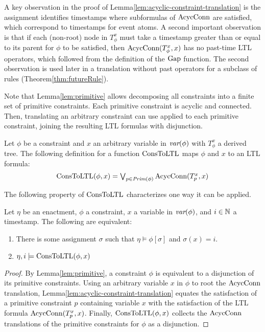 A key observation in
the proof of Lemma\:\ref{lem:acyclic-constraint-translation}
is the assignment identifies timestamps where subformulas of $\text{AcycConn}$ are satisfied,
which correspond to timestamps for event atoms.
A second important observation
is that if
each (non-root) node in $T_\phi^x$ must take a timestamp greater than
or equal to its parent for $\phi$ to be satisfied,
then $\text{AcycConn}(T_\phi^x,x)$ has no past-time LTL operators,
which followed from the definition of the $\text{Gap}$ function.
The second observation is used later in a translation without
past operators for a subclass of rules
(Theorem\:\ref{thm:futureRule}).

\smallskip

Note that
Lemma\:\ref{lem:primitive} allows decomposing
all constraints into a finite set of primitive constraints.
Each primitive constraint is acyclic and connected.
Then, translating an arbitrary constraint
can use {\AcycConn} applied to each primitive constraint,
joining the resulting LTL formulas with disjunction.

Let $\phi$ be a constraint and
$x$ an arbitrary variable in $\textit{var}(\phi)$ with
$T^x_{\phi}$ a derived tree.
The following definition for a function $\text{ConsToLTL}$
maps $\phi$ and $x$ to an LTL formula:
\[\textstyle
\text{ConsToLTL}(\phi,x)=\bigvee_{p \in \textit{Prim}(\phi)}\text{AcycConn}(T_p^x,x)
\]

The following property of $\text{ConsToLTL}$
characterizes one way it can be applied.

\begin{lemma}\label{lem:primitive-ltl}
  Let $\eta$ be an enactment,
  $\phi$ a constraint,
  $x$ a variable in $\textit{var}(\phi)$, and
  $i\in\mathbb{N}$ a timestamp.
  The following are equivalent:
  \begin{enumerate}
  \item
    There is some assignment $\sigma$
    such that $\eta\models\phi[\sigma]$ and $\sigma(x)=i$.
  \item
    $\eta,i\models\text{ConsToLTL}(\phi,x)$
  \end{enumerate}
\end{lemma}

\begin{proof}
By Lemma\:\ref{lem:primitive},
a constraint $\phi$ is equivalent
to a disjunction of its primitive constraints.
Using an arbitrary variable $x$ in $\phi$ to root the $\text{AcycConn}$ translation,
Lemma\:\ref{lem:acyclic-constraint-translation}
equates the satisfaction of a primitive constraint $p$
containing variable $x$
with the satisfaction of the LTL formula $\text{AcycConn}(T_p^x,x)$.
Finally, $\text{ConsToLTL}(\phi,x)$ collects the $\text{AcycConn}$ translations of
the primitive constraints for $\phi$ as a disjunction.
\end{proof}

